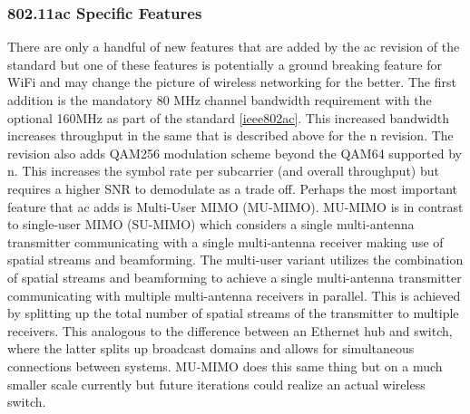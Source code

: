 \subsubsection{802.11ac Specific Features}

There are only a handful of new features that are added by the ac revision of the standard but one of these features is potentially a ground breaking feature for WiFi and may change the picture of wireless networking for the better. The first addition is the mandatory 80 MHz channel bandwidth requirement with the optional 160MHz as part of the standard \ref{ieee802ac}. This increased bandwidth increases throughput in the same that is described above for the n revision. The revision also adds QAM256 modulation scheme beyond the QAM64 supported by n. This increases the symbol rate per subcarrier (and overall throughput) but requires a higher SNR to demodulate as a trade off. Perhaps the most important feature that ac adds is Multi-User MIMO (MU-MIMO). MU-MIMO is in contrast to single-user MIMO (SU-MIMO) which considers a single multi-antenna transmitter communicating with a single multi-antenna receiver making use of spatial streams and beamforming. The multi-user variant utilizes the combination of spatial streams and beamforming to achieve a single multi-antenna transmitter communicating with multiple multi-antenna receivers in parallel. This is achieved by splitting up the total number of spatial streams of the transmitter to multiple receivers. This analogous to the difference between an Ethernet hub and switch, where the latter splits up broadcast domains and allows for simultaneous connections between systems. MU-MIMO does this same thing but on a much smaller scale currently but future iterations could realize an actual wireless switch.
